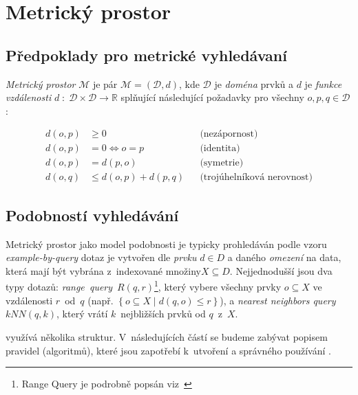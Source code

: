 \section{Metrický prostor}

\subsection{Předpoklady pro metrické vyhledávaní}

\emph{Metrický prostor }$\mathcal{M}$ je pár $\mathcal{M}=(\mathcal{D},d)$,
kde $\mathcal{D}$ je \emph{doména} prvků a $d$ je \emph{funkce vzdálenosti}
$d\;:\;\mathcal{D}\times\mathcal{D}\rightarrow\mathbb{R}$ splňující
následující požadavky pro všechny $o,p,q\in\mathcal{D}$:

\begin{align*}
d(o,p) & \geq0 &  & \textrm{(nezápornost)}\\
d(o,p) & =0\Longleftrightarrow o=p &  & \textrm{(identita)}\\
d(o,p) & =d(p,o) &  & \textrm{(symetrie)}\\
d(o,q) & \leq d(o,p)+d(p,q) &  & \textrm{(trojúhelníková nerovnost)}
\end{align*}

\subsection{Podobností vyhledávání}

Metrický prostor jako model podobnosti je typicky prohledáván podle
vzoru \emph{example-by-query} \textendash{} dotaz je vytvořen dle
\emph{prvku} $d\in D$ a daného \emph{omezení} na data, která mají
být vybrána z~indexované množiny$X\subseteq D$\@. Nejjednodušší
jsou dva typy dotazů: \emph{range~query}~$R(q,r)$\footnote{Range Query je podrobně popsán viz~
}, který vybere všechny prvky $o\subseteq X$ ve vzdálenosti $r$~od~$q$
(např. $\left\{ o\subseteq X\mid d(q,o)\leq r\right\} $), a \emph{nearest
neighbors query} $kNN(q,k)$, který vrátí $k$~nejbližších prvků
od $q$~z~$X$\@.

\MIndex{} využívá několika struktur\@. V~následujících částí se budeme
zabývat popisem pravidel (algoritmů), které jsou zapotřebí k~utvoření
a správného používání .